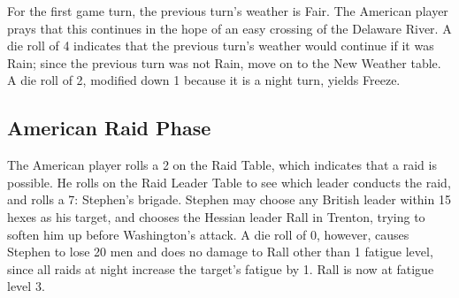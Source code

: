 \documentclass[11pt]{article}
\begin{document}
For the first game turn, the previous turn's weather is Fair. The American player prays that this continues in the hope of an easy crossing of the Delaware River. A die roll of 4 indicates that the previous turn's weather would continue if it was Rain; since the previous turn was not Rain, move on to the New Weather table. A die roll of 2, modified down 1 because it is a night turn, yields Freeze.

\subsection{American Raid Phase}

The American player rolls a 2 on the Raid Table, which indicates that a raid is possible. He rolls on the Raid Leader Table to see which leader conducts the raid, and rolls a 7: Stephen's brigade. Stephen may choose any British leader within 15 hexes as his target, and chooses the Hessian leader Rall in Trenton, trying to soften him up before Washington's attack. A die roll of 0, however, causes Stephen to lose 20 men and does no damage to Rall other than 1 fatigue level, since all raids at night increase the target's fatigue by 1. Rall is now at fatigue level 3.
\end{document}
